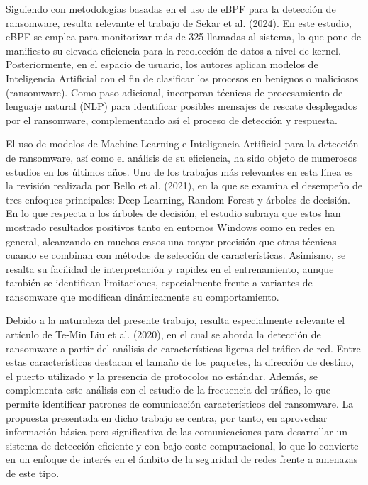 Siguiendo con metodologías basadas en el uso de eBPF para la detección de ransomware, resulta relevante el trabajo de Sekar et al. (2024)\cite{Sekar2024EBPFAI}. En este estudio, eBPF se emplea para monitorizar más de 325 llamadas al sistema, lo que pone de manifiesto su elevada eficiencia para la recolección de datos a nivel de kernel. Posteriormente, en el espacio de usuario, los autores aplican modelos de Inteligencia Artificial con el fin de clasificar los procesos en benignos o maliciosos (ransomware). Como paso adicional, incorporan técnicas de procesamiento de lenguaje natural (NLP) para identificar posibles mensajes de rescate desplegados por el ransomware, complementando así el proceso de detección y respuesta.

El uso de modelos de Machine Learning e Inteligencia Artificial para la detección de ransomware, así como el análisis de su eficiencia, ha sido objeto de numerosos estudios en los últimos años. Uno de los trabajos más relevantes en esta línea es la revisión realizada por Bello et al. (2021)\cite{Bello2021RansomwareSurvey}, en la que se examina el desempeño de tres enfoques principales: Deep Learning, Random Forest y árboles de decisión. En lo que respecta a los árboles de decisión, el estudio subraya que estos han mostrado resultados positivos tanto en entornos Windows como en redes en general, alcanzando en muchos casos una mayor precisión que otras técnicas cuando se combinan con métodos de selección de características. Asimismo, se resalta su facilidad de interpretación y rapidez en el entrenamiento, aunque también se identifican limitaciones, especialmente frente a variantes de ransomware que modifican dinámicamente su comportamiento.

Debido a la naturaleza del presente trabajo, resulta especialmente relevante el artículo de Te-Min Liu et al. (2020)\cite{LiuKaoChen2020LooCipher}, en el cual se aborda la detección de ransomware a partir del análisis de características ligeras del tráfico de red. Entre estas características destacan el tamaño de los paquetes, la dirección de destino, el puerto utilizado y la presencia de protocolos no estándar. Además, se complementa este análisis con el estudio de la frecuencia del tráfico, lo que permite identificar patrones de comunicación característicos del ransomware. La propuesta presentada en dicho trabajo se centra, por tanto, en aprovechar información básica pero significativa de las comunicaciones para desarrollar un sistema de detección eficiente y con bajo coste computacional, lo que lo convierte en un enfoque de interés en el ámbito de la seguridad de redes frente a amenazas de este tipo.
